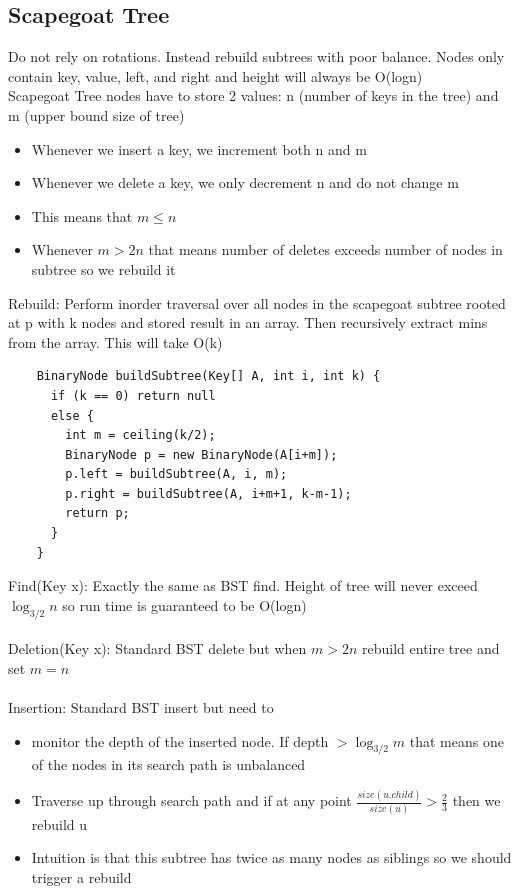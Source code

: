 \documentclass{article}
\begin{document}
  \subsection{Scapegoat Tree}
  Do not rely on rotations. Instead rebuild subtrees with poor balance. Nodes only contain key, value, left, and right and height will always be O(logn)\\
  Scapegoat Tree nodes have to store 2 values: n (number of keys in the tree) and m (upper bound size of tree)
  \begin{itemize}[noitemsep]
    \item Whenever we insert a key, we increment both n and m
    \item Whenever we delete a key, we only decrement n and do not change m
    \item This means that $m \leq n$
    \item Whenever $m > 2n$ that means number of deletes exceeds number of nodes in subtree so we rebuild it \\
  \end{itemize}
  Rebuild: Perform inorder traversal over all nodes in the scapegoat subtree rooted at p with k nodes and stored result in an array. Then recursively extract mins from the array. This will take O(k)
  \begin{lstlisting}
    BinaryNode buildSubtree(Key[] A, int i, int k) {
      if (k == 0) return null
      else {
        int m = ceiling(k/2);
        BinaryNode p = new BinaryNode(A[i+m]);
        p.left = buildSubtree(A, i, m);
        p.right = buildSubtree(A, i+m+1, k-m-1);
        return p;
      }
    }
  \end{lstlisting}
  Find(Key x): Exactly the same as BST find. Height of tree will never exceed $\log_{3/2}n$ so run time is guaranteed to be O(logn)\\ \\
  Deletion(Key x): Standard BST delete but when $m > 2n$ rebuild entire tree and set $m = n$\\ \\
  \newpage
  Insertion: Standard BST insert but need to 
  \begin{itemize}[noitemsep]
    \item monitor the depth of the inserted node. If depth $> \log_{3/2}m$ that means one of the nodes in its search path is unbalanced
    \item Traverse up through search path and if at any point $\frac{size(u.child)}{size(u)} > \frac{2}{3}$ then we rebuild u
    \item Intuition is that this subtree has twice as many nodes as siblings so we should trigger a rebuild\\
  \end{itemize}
\end{document}

